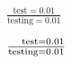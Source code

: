 \documentclass{article}
\newcommand\samelenas[2]{\phantom{\text{#2}}\mathllap{\text{#1}}}
\begin{document}
$\frac{\text{test} = 0.01}
      {\text{testing} = 0.01}$

$\frac{\samelenas{test}{testing} = 0.01}
      {\text{testing} = 0.01}$
\end{document}

